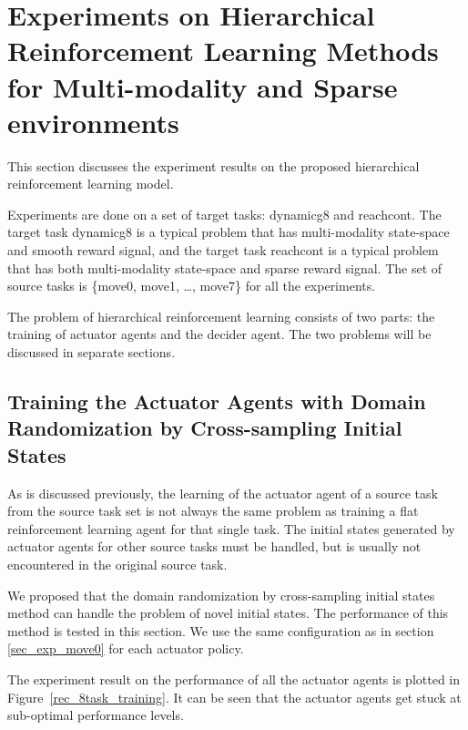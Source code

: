 
\section{Experiments on Hierarchical Reinforcement Learning Methods for Multi-modality and Sparse environments}
This section discusses the experiment results on the proposed hierarchical reinforcement learning model.

Experiments are done on a set of target tasks: dynamicg8 and reachcont. The target task dynamicg8 is a typical problem that has multi-modality state-space and smooth reward signal, and the target task reachcont is a typical problem that has both multi-modality state-space and sparse reward signal. The set of source tasks is  \{move0, move1, \dots, move7\} for all the experiments.

The problem of hierarchical reinforcement learning consists of two parts: the training of actuator agents and the decider agent. The two problems will be discussed in separate sections.


\subsection{Training the Actuator Agents with Domain Randomization by Cross-sampling Initial States}
As is discussed previously, the learning of the actuator agent of a source task from the source task set is not always the same problem as training a flat reinforcement learning agent for that single task. The initial states generated by actuator agents for other source tasks must be handled, but is usually not encountered in the original source task.

We proposed that the domain randomization by cross-sampling initial states method can handle the problem of novel initial states. The performance of this method is tested in this section. We use the same configuration as in section \ref{sec_exp_move0} for each actuator policy.  

The experiment result on the performance of all the actuator agents is plotted in Figure~\ref{rec_8task_training}. It can be seen that the actuator agents get stuck at sub-optimal performance levels. 

